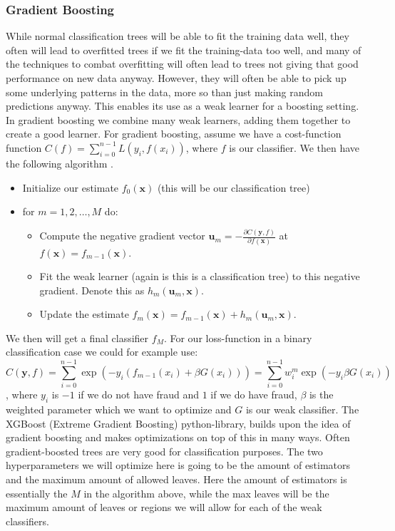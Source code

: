 \documentclass{article}
\begin{document}
\subsubsection{Gradient Boosting}
While normal classification trees will be able to fit the training data well,
they often will lead to overfitted trees if we fit the training-data too well,
and many of the techniques to combat overfitting will often lead to trees not
giving that good performance on new data anyway. However, they will often be
able to pick up some underlying patterns in the data, more so than just making
random predictions anyway. This enables its use as a weak learner for a boosting
setting. In gradient boosting we combine many weak learners, adding them
together to create a good learner. For gradient boosting, assume we have a
cost-function function $C(f) = \sum_{i=0}^{n-1} L(y_i, f(x_i))$, where $f$ is
our classifier. We then have the following algorithm \cite[s.~Gradient Boosting,
	algorithm]{lecturesweek46}.
\begin{itemize}
	\item Initialize our estimate $f_0(\bm{x})$ (this will be our classification tree)
	\item for $m = 1, 2, \dots, M$ do:
	      \begin{itemize}
		      \item Compute the negative gradient vector $\bm{u}_m = -\frac{\partial C(\bm{y}, f)}{\partial f(\bm{x})}$ at $f(\bm{x}) = f_{m - 1}(\bm{x})$.
		      \item Fit the weak learner (again is this is a classification tree) to this negative gradient. Denote this as $h_m(\bm{u}_m, \bm{x})$.
		      \item Update the estimate $f_m(\bm{x}) = f_{m-1}(\bm{x}) + h_m(\bm{u}_m, \bm{x})$.
	      \end{itemize}
\end{itemize}
We then will get a final classifier $f_M$. For our loss-function in a
binary classification case we could for example use:
\[
	C(\bm{y}, f) = \sum_{i=0}^{n-1} \exp(-y_i (f_{m-1}(x_i) + \beta G(x_i))) = \sum_{i=0}^{n-1} w_i^m \exp(-y_i \beta G(x_i))
\]
\cite[s.~Adaptive Boosting, AdaBoost]{lecturesweek46}, where $y_i$ is $-1$
if we do not have fraud and $1$ if we do have fraud, $\beta$ is the weighted
parameter which we want to optimize and $G$ is our weak classifier. The XGBoost
(Extreme Gradient Boosting) python-library, builds upon the idea of gradient
boosting and makes optimizations on top of this in many ways. Often
gradient-boosted trees are very good for classification purposes. The two
hyperparameters we will optimize here is going to be the amount of estimators
and the maximum amount of allowed leaves. Here the amount of estimators is
essentially the $M$ in the algorithm above, while the max leaves will be the
maximum amount of leaves or regions we will allow for each of the weak
classifiers.
\end{document}
